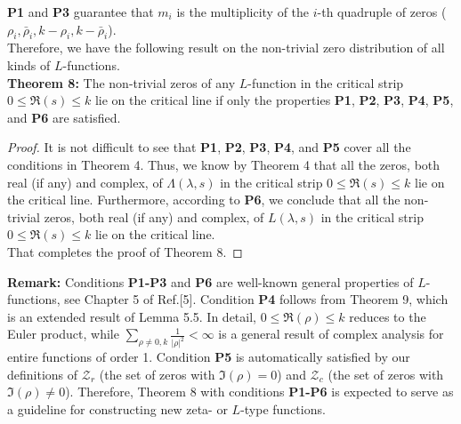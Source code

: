 \documentclass[12pt]{article}
\begin{document}
 \textbf{P1} and \textbf{P3} guarantee that $m_i$ is the multiplicity of the $i$-th quadruple of zeros ($\rho_i, \bar\rho_i, k-\rho_i, k-\bar\rho_i$).\\

Therefore, we have the following result on the non-trivial zero distribution of all kinds of $L$-functions.\\

\textbf{Theorem 8:} The non-trivial zeros of any $L$-function in the critical strip $0 \leq \Re(s) \leq k$ lie on the critical line if only the properties \textbf{P1}, \textbf{P2}, \textbf{P3}, \textbf{P4}, \textbf{P5}, and \textbf{P6} are satisfied.

\begin{proof}
It is not difficult to see that \textbf{P1}, \textbf{P2}, \textbf{P3}, \textbf{P4}, and \textbf{P5} cover all the conditions in Theorem 4. Thus, we know by Theorem 4 that all the zeros, both real (if any) and  complex, of $\Lambda(\lambda, s)$ in the critical strip $0 \leq \Re(s) \leq k$ lie on the critical line. Furthermore, according to \textbf{P6}, we conclude that all the non-trivial zeros, both real (if any) and  complex, of $L(\lambda, s)$ in the critical strip $0 \leq \Re(s) \leq k$ lie on the critical line.\\
That completes the proof of Theorem 8.
\end{proof}

\textbf{Remark:} Conditions \textbf{P1-P3} and \textbf{P6} are well-known general properties of $L$-functions, see Chapter 5 of Ref.[5]. Condition \textbf{P4} follows from Theorem 9, which is an extended result of Lemma 5.5. In detail, $0 \leq \Re(\rho) \leq k$ reduces to the Euler product, while $\displaystyle\sum_{\rho\neq 0, k} \frac{1}{|\rho|^2} < \infty$ is a general result of complex analysis for entire functions of order 1. Condition \textbf{P5} is automatically satisfied by our definitions of $\mathcal{Z}_{r}$ (the set of zeros with $\Im(\rho)=0$) and $\mathcal{Z}_{c}$ (the set of zeros with $\Im(\rho)\neq 0$).
Therefore, Theorem 8 with conditions \textbf{P1-P6} is expected to serve as a guideline for constructing new zeta- or $L$-type functions.\\
\end{document}
